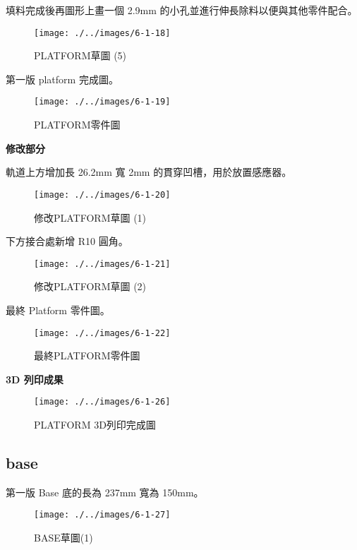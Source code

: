 填料完成後再圖形上畫一個 2.9mm 的小孔並進行伸長除料以便與其他零件配合。

 \begin{figure}[htbp]
        \centering
        \texttt{[image: ./../images/6-1-18]}
        \caption{PLATFORM草圖 (5)}
    \end{figure}

\newpage

第一版 platform 完成圖。

\begin{figure}[htbp]
    \centering
    \texttt{[image: ./../images/6-1-19]}
    \caption{PLATFORM零件圖}
\end{figure}

\textbf{修改部分}

軌道上方增加長 26.2mm 寬 2mm 的貫穿凹槽，用於放置感應器。

\begin{figure}[htbp]
    \centering
    \texttt{[image: ./../images/6-1-20]}
    \caption{修改PLATFORM草圖 (1)}
\end{figure}


下方接合處新增 R10 圓角。

\begin{figure}[htbp]
    \centering
    \texttt{[image: ./../images/6-1-21]}
    \caption{修改PLATFORM草圖 (2)}
\end{figure}

\newpage


最終 Platform 零件圖。

\begin{figure}[htbp]
    \centering
    \texttt{[image: ./../images/6-1-22]}
    \caption{最終PLATFORM零件圖}
\end{figure}

\textbf{3D 列印成果}

\begin{figure}[htbp]
    \centering
    \texttt{[image: ./../images/6-1-26]}
    \caption{PLATFORM 3D列印完成圖}
\end{figure}

\newpage

\subsection{base}

第一版 Base 底的長為 237mm 寬為 150mm。

\begin{figure}[htbp]
    \centering
    \texttt{[image: ./../images/6-1-27]}
    \caption{BASE草圖(1)}
\end{figure}



